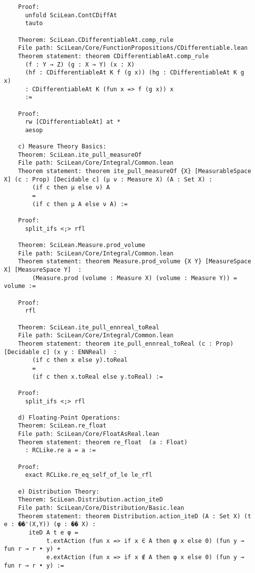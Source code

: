 \documentclass{article} %
\begin{document}
\begin{verbatim}
    Proof:
      unfold SciLean.ContCDiffAt
      tauto
    
    Theorem: SciLean.CDifferentiableAt.comp_rule
    File path: SciLean/Core/FunctionPropositions/CDifferentiable.lean
    Theorem statement: theorem CDifferentiableAt.comp_rule
      (f : Y → Z) (g : X → Y) (x : X)
      (hf : CDifferentiableAt K f (g x)) (hg : CDifferentiableAt K g x)
      : CDifferentiableAt K (fun x => f (g x)) x
      :=
    
    Proof:
      rw [CDifferentiableAt] at *
      aesop

    c) Measure Theory Basics:
    Theorem: SciLean.ite_pull_measureOf
    File path: SciLean/Core/Integral/Common.lean
    Theorem statement: theorem ite_pull_measureOf {X} [MeasurableSpace X] (c : Prop) [Decidable c] (μ ν : Measure X) (A : Set X) :
        (if c then μ else ν) A
        =
        (if c then μ A else ν A) :=
    
    Proof:
      split_ifs <;> rfl
    
    Theorem: SciLean.Measure.prod_volume
    File path: SciLean/Core/Integral/Common.lean
    Theorem statement: theorem Measure.prod_volume {X Y} [MeasureSpace X] [MeasureSpace Y]  :
        (Measure.prod (volume : Measure X) (volume : Measure Y)) = volume :=
    
    Proof:
      rfl
    
    Theorem: SciLean.ite_pull_ennreal_toReal
    File path: SciLean/Core/Integral/Common.lean
    Theorem statement: theorem ite_pull_ennreal_toReal (c : Prop) [Decidable c] (x y : ENNReal)  :
        (if c then x else y).toReal
        =
        (if c then x.toReal else y.toReal) :=
    
    Proof:
      split_ifs <;> rfl

    d) Floating-Point Operations:
    Theorem: SciLean.re_float
    File path: SciLean/Core/FloatAsReal.lean
    Theorem statement: theorem re_float  (a : Float)
      : RCLike.re a = a :=
    
    Proof:
      exact RCLike.re_eq_self_of_le le_rfl

    e) Distribution Theory:
    Theorem: SciLean.Distribution.action_iteD
    File path: SciLean/Core/Distribution/Basic.lean
    Theorem statement: theorem Distribution.action_iteD (A : Set X) (t e : ��'(X,Y)) (φ : �� X) :
       iteD A t e φ =
            t.extAction (fun x => if x ∈ A then φ x else 0) (fun y ⊸ fun r ⊸ r • y) +
            e.extAction (fun x => if x ∉ A then φ x else 0) (fun y ⊸ fun r ⊸ r • y) :=
    

\end{verbatim}
\end{document}
